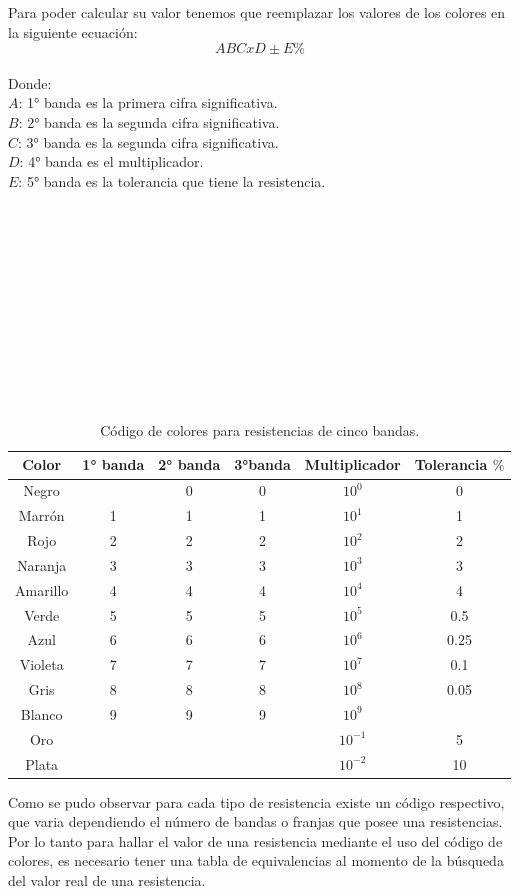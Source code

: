 Para poder calcular su valor tenemos que reemplazar los valores de los colores en la siguiente ecuación:\\
\begin{equation*}
	ABCxD \pm E\%
\end{equation*}\\
Donde: \\
$ A $: 1° banda es la primera cifra significativa.\\
$ B $: 2° banda es la segunda cifra significativa.\\
$ C $: 3° banda es la segunda cifra significativa.\\
$ D $: 4° banda es el multiplicador.\\
$E$: 5° banda es la tolerancia que tiene la resistencia.\\
\\
\\
\\
\\
\\
\\
\\
\\
\\
\\
\\
\begin{table}[h]
	\begin{center}
		\begin{tabular}{|c | c | c | c |c|c|}
			\hline
			Color& 1° banda & 2° banda &3°banda& Multiplicador & Tolerancia $ \% $\\
			\hline
			Negro&&0 & 0 &$ 10^{0}$ & 0\\
			\hline
			Marrón &1& 1&1&$ 10^{1}$&1\\
			\hline
			Rojo & 2&2&2&$ 10^{2}$&2\\
			\hline
			Naranja & 3&3&3&$ 10^{3}$&3\\
			\hline
			Amarillo & 4&4&4&$ 10^{4}$&4\\
			\hline
			Verde & 5&5&5&$ 10^{5}$&0.5\\
			\hline
			Azul & 6&6&6&$ 10^{6}$&0.25\\
			\hline
			Violeta & 7&7&7&$ 10^{7}$&0.1\\
			\hline
			Gris & 8&8&8&$ 10^{8}$&0.05\\
			\hline
			Blanco & 9&9&9&$ 10^{9}$&\\
			\hline
			Oro && &&$ 10^{-1}$&5\\
			\hline
			Plata && &&$ 10^{-2}$&10\\
			\hline
		\end{tabular}
		\caption{Código de colores para resistencias de cinco bandas.}
	\end{center}
\end{table}

Como se pudo observar para cada tipo de resistencia existe un código respectivo, que varia dependiendo el número de bandas o franjas que posee una resistencias. Por lo tanto para hallar el valor de una resistencia mediante el uso del código de colores, es necesario tener una tabla de equivalencias al momento de la búsqueda del valor real de una resistencia.